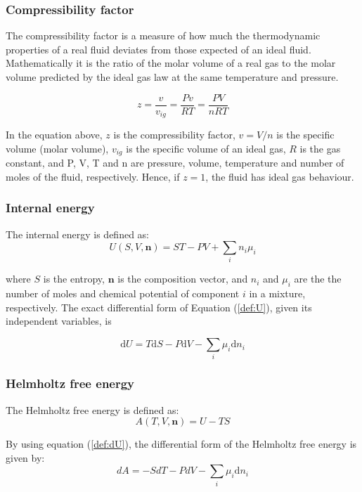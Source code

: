 \documentclass[english]{../thermomemo/thermomemo}
\numberwithin{equation}{section}
\newcommand*{\reff}[1]{(\ref{#1})}
\begin{document}
\subsubsection*{Compressibility factor}
The compressibility factor is a measure of how much the thermodynamic properties of a real fluid deviates from those expected of an ideal fluid. Mathematically it is the ratio of the molar volume of a real gas to the molar volume predicted by the ideal gas law at the same temperature and pressure.

\begin{equation}
\label{def:z}
z = \frac{v}{v_{ig}} = \frac{Pv}{RT} = \frac{PV}{nRT}
\end{equation}

In the equation above, $z$ is the compressibility factor, $v = V/n$ is the specific volume (molar volume), $v_{ig}$ is the specific volume of an ideal gas, $R$ is the gas constant, and P, V, T and n are pressure, volume, temperature and number of moles of the fluid, respectively. Hence, if $z = 1$, the fluid has ideal gas behaviour.

\subsubsection*{Internal energy}
The internal energy is defined as:
\begin{equation}
\label{def:U}
U(S,V,\textbf{n}) = ST - PV + \sum_i n_i \mu _i
\end{equation}

where $S$ is the entropy, $\textbf{n}$ is the composition vector, and $n_i$ and $\mu _i$ are the the number of moles and chemical potential of component $i$ in a mixture, respectively. The exact differential form of Equation \reff{def:U}, given its independent variables, is

\begin{equation}
\label{def:dU}
\mathrm{d}U  = T\mathrm{d}S - P \mathrm{d}V - \sum_i \mu_i \mathrm{d}n_i
\end{equation}

\subsubsection*{Helmholtz free energy}
The Helmholtz free energy is defined as:
\begin{equation}
\label{def:A}
A(T,V,\textbf{n}) = U - TS
\end{equation}

By using equation \reff{def:dU}, the differential form of the Helmholtz free energy is given by:
\begin{equation}
\label{def:dA}
dA = -SdT - PdV -  \sum_i \mu_i \mathrm{d}n_i
\end{equation}
\end{document}
